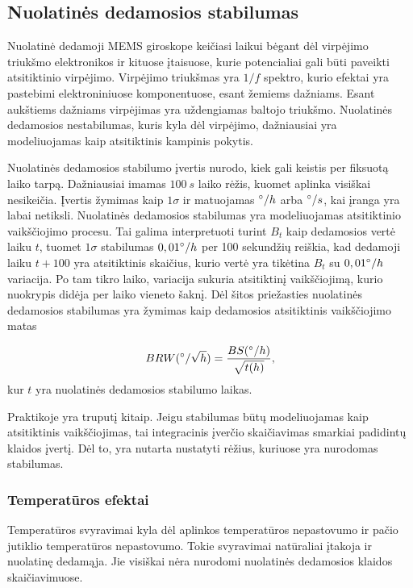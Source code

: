\subsection{Nuolatinės dedamosios stabilumas}

Nuolatinė dedamoji MEMS giroskope keičiasi laikui bėgant dėl virpėjimo triukšmo elektronikos ir kituose įtaisuose, kurie potencialiai gali būti paveikti atsitiktinio virpėjimo. 
Virpėjimo triukšmas yra $1/f$ spektro, kurio efektai yra pastebimi elektroniniuose komponentuose, esant žemiems dažniams. 
Esant aukštiems dažniams virpėjimas yra uždengiamas baltojo triukšmo. 
Nuolatinės dedamosios nestabilumas, kuris kyla dėl virpėjimo, dažniausiai yra modeliuojamas kaip atsitiktinis kampinis pokytis.

Nuolatinės dedamosios stabilumo įvertis nurodo, kiek gali keistis per fiksuotą laiko tarpą. 
Dažniausiai imamas $100~s$ laiko rėžis, kuomet aplinka visiškai nesikeičia. 
Įvertis žymimas kaip $1\sigma$ ir matuojamas $\degree/h$ arba $\degree/s$, kai įranga yra labai netiksli. 
Nuolatinės dedamosios stabilumas yra modeliuojamas atsitiktinio vaikščiojimo procesu. 
Tai galima interpretuoti turint $B_t$ kaip dedamosios vertė laiku $t$, tuomet $1\sigma$ stabilumas $0,01\degree/h$ per 100 sekundžių reiškia, kad dedamoji laiku $t+100$ yra atsitiktinis skaičius, kurio vertė yra tikėtina $B_t$ su $0,01\degree/h$ variacija. 
Po tam tikro laiko, variacija sukuria atsitiktinį vaikščiojimą, kurio nuokrypis didėja per laiko vieneto šaknį. 
Dėl šitos priežasties nuolatinės dedamosios stabilumas yra žymimas kaip dedamosios atsitiktinis vaikščiojimo matas

\begin{equation}
    BRW (\degree / \sqrt{h}) = \frac{BS(\degree/h)}{\sqrt{t(h)}},
\end{equation}
kur $t$ yra nuolatinės dedamosios stabilumo laikas.

Praktikoje yra truputį kitaip. 
Jeigu stabilumas būtų modeliuojamas kaip atsitiktinis vaikščiojimas, tai integracinis įverčio skaičiavimas smarkiai padidintų klaidos įvertį. 
Dėl to, yra nutarta nustatyti rėžius, kuriuose yra nurodomas stabilumas.

\subsubsection{Temperatūros efektai}

Temperatūros svyravimai kyla dėl aplinkos temperatūros nepastovumo ir pačio jutiklio temperatūros nepastovumo. 
Tokie svyravimai natūraliai įtakoja ir nuolatinę dedamąja. 
Jie visiškai nėra nurodomi nuolatinės dedamosios klaidos skaičiavimuose.

